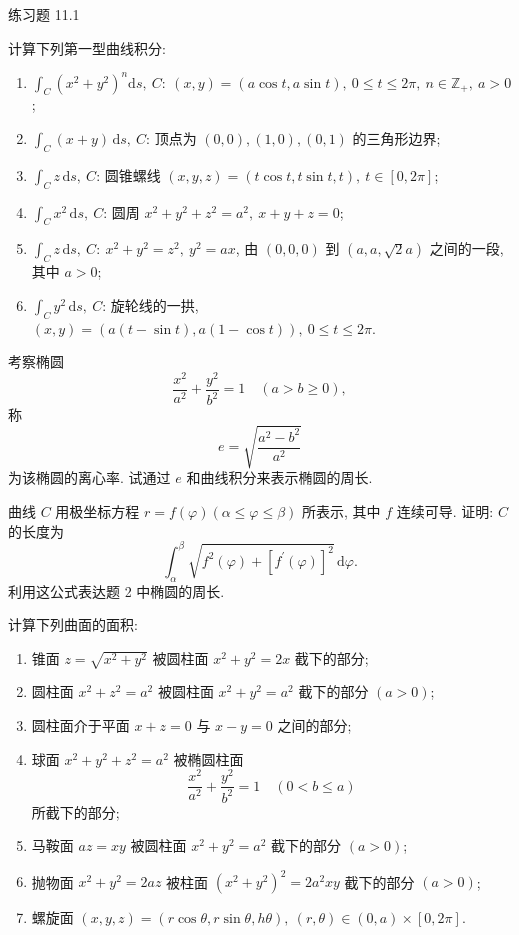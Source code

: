 \begin{exblock}{练习题 11.1}
\item 计算下列第一型曲线积分:
\begin{enumerate}[label=(\arabic*),leftmargin=2.6em,itemsep=0.15\baselineskip,topsep=0.2\baselineskip]
  \item $\int_{C}\left(x^{2}+y^{2}\right)^{n} \mathrm{d} s,\ C:\ (x, y)=(a \cos t, a \sin t),\ 0 \leqslant t \leqslant 2 \pi,\ n \in \mathbb{Z}_{+},\ a>0$;
  \item $\int_{C}(x+y)\,\mathrm{d} s,\ C$: 顶点为 $(0,0),(1,0),(0,1)$ 的三角形边界;
  \item $\int_{C} z\,\mathrm{d} s,\ C$: 圆锥螺线 $(x, y, z)=(t \cos t, t \sin t, t),\ t \in[0,2 \pi]$;
  \item $\int_{C} x^{2}\,\mathrm{d} s,\ C$: 圆周 $x^{2}+y^{2}+z^{2}=a^{2},\ x+y+z=0$;
  \item $\int_{C} z\,\mathrm{d} s,\ C:\ x^{2}+y^{2}=z^{2},\ y^{2}=a x$, 由 $(0,0,0)$ 到 $(a, a, \sqrt{2} a)$ 之间的一段, 其中 $a>0$;
  \item $\int_{C} y^{2}\,\mathrm{d} s,\ C$: 旋轮线的一拱, $(x, y)=(a(t-\sin t), a(1-\cos t)),\ 0 \leqslant t \leqslant 2 \pi$.
\end{enumerate}

\item 考察椭圆
\[
  \frac{x^{2}}{a^{2}}+\frac{y^{2}}{b^{2}}=1 \quad(a>b \geqslant 0),
\]
称
\[
  e=\sqrt{\frac{a^{2}-b^{2}}{a^{2}}}
\]
为该椭圆的离心率. 试通过 $e$ 和曲线积分来表示椭圆的周长.

\item 曲线 $C$ 用极坐标方程 $r=f(\varphi)(\alpha \leqslant \varphi \leqslant \beta)$ 所表示, 其中 $f$ 连续可导. 证明: $C$ 的长度为
\[
  \int_{\alpha}^{\beta} \sqrt{f^{2}(\varphi)+\left[f^{\prime}(\varphi)\right]^{2}}\,\mathrm{d} \varphi.
\]
利用这公式表达题 2 中椭圆的周长.

\item 计算下列曲面的面积:
\begin{enumerate}[label=(\arabic*),leftmargin=2.6em,itemsep=0.15\baselineskip,topsep=0.2\baselineskip]
  \item 锥面 $z=\sqrt{x^{2}+y^{2}}$ 被圆柱面 $x^{2}+y^{2}=2 x$ 截下的部分;
  \item 圆柱面 $x^{2}+z^{2}=a^{2}$ 被圆柱面 $x^{2}+y^{2}=a^{2}$ 截下的部分 $(a>0)$;
  \item 圆柱面介于平面 $x+z=0$ 与 $x-y=0$ 之间的部分;
  \item 球面 $x^{2}+y^{2}+z^{2}=a^{2}$ 被椭圆柱面
    \[
      \frac{x^{2}}{a^{2}}+\frac{y^{2}}{b^{2}}=1 \quad(0<b \leqslant a)
    \]
    所截下的部分;
  \item 马鞍面 $a z=x y$ 被圆柱面 $x^{2}+y^{2}=a^{2}$ 截下的部分 $(a>0)$;
  \item 抛物面 $x^{2}+y^{2}=2 a z$ 被柱面 $\left(x^{2}+y^{2}\right)^{2}=2 a^{2} x y$ 截下的部分 $(a>0)$;
  \item 螺旋面 $(x, y, z)=(r \cos \theta, r \sin \theta, h \theta),\ (r, \theta) \in(0, a) \times[0,2 \pi]$.
\end{enumerate}


\end{exblock}
